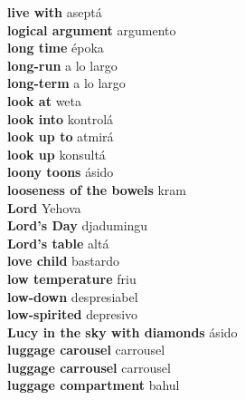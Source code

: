 \textbf{ live with  } aseptá \\
\textbf{ logical argument  } argumento \\
\textbf{ long time  } époka \\
\textbf{ long-run  } a lo largo \\
\textbf{ long-term  } a lo largo \\
\textbf{ look at  } weta \\
\textbf{ look into  } kontrolá \\
\textbf{ look up to  } atmirá \\
\textbf{ look up  } konsultá \\
\textbf{ loony toons  } ásido \\
\textbf{ looseness of the bowels  } kram \\
\textbf{ Lord  } Yehova \\
\textbf{ Lord’s Day  } djadumingu \\
\textbf{ Lord’s table  } altá \\
\textbf{ love child  } bastardo \\
\textbf{ low temperature  } friu \\
\textbf{ low-down  } despresiabel \\
\textbf{ low-spirited  } depresivo \\
\textbf{ Lucy in the sky with diamonds  } ásido \\
\textbf{ luggage carousel  } carrousel \\
\textbf{ luggage carrousel  } carrousel \\
\textbf{ luggage compartment  } bahul \\
